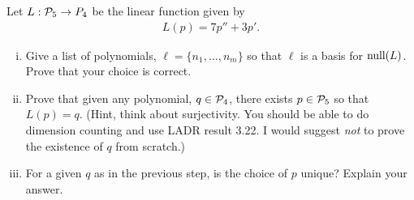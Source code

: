 \begin{question}
	\normalfont
	
	
	
	
	Let $L:\P_5\to P_4$ be the linear function given by 
	\begin{align*}
		L(p) = 7p'' + 3p'.
	\end{align*}
	\begin{enumerate}[(i)]
		\item Give a list of polynomials, $\ell = \{n_1,\dots, n_m\}$ so that $\ell$ is a basis for $\NullLA(L)$.  Prove that your choice is correct.
		
		
		\item Prove that given any polynomial, $q\in \P_4$, there exists $p\in\P_5$ so that $L(p)=q$.  (Hint, think about surjectivity. You should be able to do dimension counting and use LADR result 3.22.  I would suggest \emph{not} to prove the existence of $q$ from scratch.)
		
		\item For a given $q$ as in the previous step, is the choice of $p$ unique?  Explain your answer.
		
	\end{enumerate}
\end{question}
